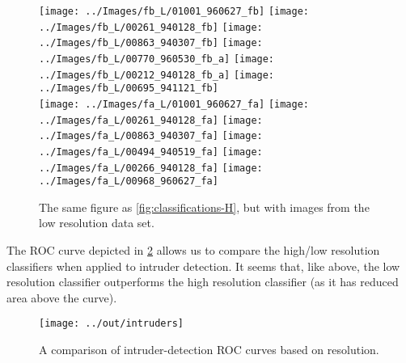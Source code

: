\documentclass[headings=optiontoheadandtoc,listof=totoc,parskip=full]{scrartcl}
\begin{document}
\begin{figure}[H]
	\centering
	\texttt{[image: ../Images/fb\_L/01001\_960627\_fb]}
	\texttt{[image: ../Images/fb\_L/00261\_940128\_fb]}
	\texttt{[image: ../Images/fb\_L/00863\_940307\_fb]}
	\quad
	\texttt{[image: ../Images/fb\_L/00770\_960530\_fb\_a]}
	\texttt{[image: ../Images/fb\_L/00212\_940128\_fb\_a]}
	\texttt{[image: ../Images/fb\_L/00695\_941121\_fb]}\\
	\texttt{[image: ../Images/fa\_L/01001\_960627\_fa]}
	\texttt{[image: ../Images/fa\_L/00261\_940128\_fa]}
	\texttt{[image: ../Images/fa\_L/00863\_940307\_fa]}
	\quad
	\texttt{[image: ../Images/fa\_L/00494\_940519\_fa]}
	\texttt{[image: ../Images/fa\_L/00266\_940128\_fa]}
	\texttt{[image: ../Images/fa\_L/00968\_960627\_fa]}
	\caption{The same figure as \cref{fig:classifications-H}, but with images from the low resolution data set.}
	\label{fig:classifications-L}
\end{figure}

The ROC curve depicted in \cref{fig:intruders} allows us to compare the high/low resolution classifiers when applied to intruder detection. It seems that, like above, the low resolution classifier outperforms the high resolution classifier (as it has reduced area above the curve).

\begin{figure}[H]
    \centering
    \texttt{[image: ../out/intruders]}
    \caption{A comparison of intruder-detection ROC curves based on resolution.}
    \label{fig:intruders}
\end{figure}

\printbibliography
\end{document}
